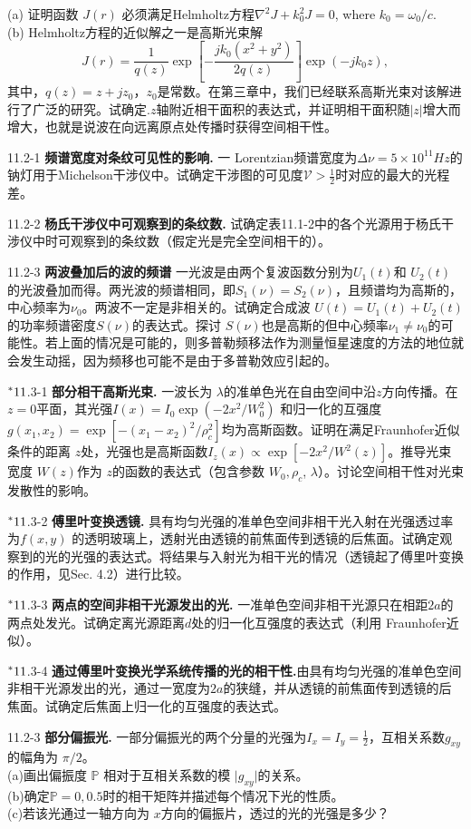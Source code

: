 \documentclass[UTF8]{ctexart}
\numberwithin{figure}{subsection}
\numberwithin{table}{subsection}
\begin{document}
{\begin{hangparas}{1.4cm}{1}
(a) 证明函数 $J(r)$ 必须满足Helmholtz方程$\nabla^2 J + k_0^2 J = 0$, where $k_0 = \omega_0 / c$.\\
(b) Helmholtz方程的近似解之一是高斯光束解
\begin{equation*}
J(r) = \frac{1}{q(z)}\exp [- \frac{jk_0 (x^2 + y^2)}{2q(z)}]\exp(- jk_0 z),
\end{equation*}
其中，$q(z) = z + jz_0$，$z_0$是常数。在第三章中，我们已经联系高斯光束对该解进行了广泛的研究。试确定.$z$轴附近相干面积的表达式，并证明相干面积随$\lvert z \rvert$增大而增大，也就是说波在向远离原点处传播时获得空间相干性。 
\par 11.2-1 \quad\textbf{频谱宽度对条纹可见性的影响.} 一 Lorentzian频谱宽度为$\Delta \nu = 5 \times 10^{11} Hz$的钠灯用于Michelson干涉仪中。试确定干涉图的可见度$\mathcal{V} > \frac{1}{2}$时对应的最大的光程差。
\par 11.2-2 \quad\textbf{杨氏干涉仪中可观察到的条纹数.} 试确定表11.1-2中的各个光源用于杨氏干涉仪中时可观察到的条纹数（假定光是完全空间相干的）。
\par 11.2-3 \quad\textbf{两波叠加后的波的频谱} 一光波是由两个复波函数分别为$U_1(t)$和 $U_2(t)$的光波叠加而得。两光波的频谱相同，即$S_1(\nu) = S_2(\nu)$，且频谱均为高斯的，中心频率为$\nu_0$。两波不一定是非相关的。试确定合成波 $U(t) = U_1(t) + U_2(t)$的功率频谱密度$S(\nu)$的表达式。探讨 $S(\nu)$也是高斯的但中心频率$\nu_1 \neq \nu_0$的可能性。若上面的情况是可能的，则多普勒频移法作为测量恒星速度的方法的地位就会发生动摇，因为频移也可能不是由于多普勒效应引起的。
\par$\prescript{\ast}{}{11}$.3-1 \quad\textbf{部分相干高斯光束.} 一波长为 $\lambda$的准单色光在自由空间中沿$z$方向传播。在$z = 0$平面，其光强$I(x) = I_0 \exp(- 2x^2 / W_0^2)$ 和归一化的互强度$g(x_1, x_2) = \exp [-(x_1 - x_2)^2 / \rho_c^2]$均为高斯函数。证明在满足Fraunhofer近似条件的距离 $z$处，光强也是高斯函数$I_z (x) \propto \exp [- 2x^2 / W^2 (z)]$。推导光束宽度 $W(z)$作为 $z$的函数的表达式（包含参数 $W_0, \rho_c$, $\lambda$）。讨论空间相干性对光束发散性的影响。
\par$\prescript{\ast}{}{11}$.3-2 \quad\textbf{傅里叶变换透镜.} 具有均匀光强的准单色空间非相干光入射在光强透过率为$f(x, y)$ 的透明玻璃上，透射光由透镜的前焦面传到透镜的后焦面。试确定观察到的光的光强的表达式。将结果与入射光为相干光的情况（透镜起了傅里叶变换的作用，见Sec. 4.2）进行比较。
\par$\prescript{\ast}{}{11}$.3-3 \quad\textbf{两点的空间非相干光源发出的光.} 一准单色空间非相干光源只在相距$2a$的两点处发光。试确定离光源距离$d$处的归一化互强度的表达式（利用 Fraunhofer近似）。
\par$\prescript{\ast}{}{11}$.3-4 \quad\textbf{通过傅里叶变换光学系统传播的光的相干性.}由具有均匀光强的准单色空间非相干光源发出的光，通过一宽度为$2a$的狭缝，并从透镜的前焦面传到透镜的后焦面。试确定后焦面上归一化的互强度的表达式。 
\par 11.2-3 \quad\textbf{部分偏振光.} 一部分偏振光的两个分量的光强为$I_x = I_y = \frac{1}{2}$，互相关系数$g_{xy}$的幅角为 $\pi / 2$。\\ 
(a)画出偏振度 $\mathbb{P}$ 相对于互相关系数的模 $\lvert g_{xy} \rvert$的关系。\\
(b)确定$\mathbb{P} = 0, 0.5$时的相干矩阵并描述每个情况下光的性质。\\
(c)若该光通过一轴方向为 $x$方向的偏振片，透过的光的光强是多少？ 
\end{hangparas}
}
\end{document}
